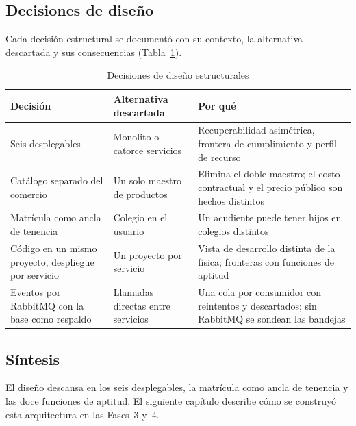 \subsection{Decisiones de diseño}
\label{sec:adr}

Cada decisión estructural se documentó con su contexto, la alternativa descartada y sus consecuencias \citep{nygard_documenting_2011} (Tabla~\ref{tab:decisiones-diseno}).

\begin{table}[!htb]
\centering
\caption{Decisiones de diseño estructurales}
\label{tab:decisiones-diseno}
\small
\begin{tabular}{@{}p{3.8cm}p{4.0cm}p{5.0cm}@{}}
\toprule
\textbf{Decisión} & \textbf{Alternativa descartada} & \textbf{Por qué} \\
\midrule
Seis desplegables & Monolito o catorce servicios & Recuperabilidad asimétrica, frontera de cumplimiento y perfil de recurso \\
Catálogo separado del comercio & Un solo maestro de productos & Elimina el doble maestro; el costo contractual y el precio público son hechos distintos \\
Matrícula como ancla de tenencia & Colegio en el usuario & Un acudiente puede tener hijos en colegios distintos \\
Código en un mismo proyecto, despliegue por servicio & Un proyecto por servicio & Vista de desarrollo distinta de la física; fronteras con funciones de aptitud \\
Eventos por RabbitMQ con la base como respaldo & Llamadas directas entre servicios & Una cola por consumidor con reintentos y descartados; sin RabbitMQ se sondean las bandejas \\
\bottomrule
\end{tabular}
\end{table}

\subsection{Síntesis}

El diseño descansa en los seis desplegables, la matrícula como ancla de tenencia y las doce funciones de aptitud. El siguiente capítulo describe cómo se construyó esta arquitectura en las Fases~3 y~4.